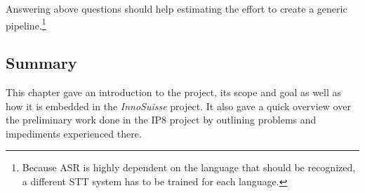 Answering above questions should help estimating the effort to create a generic pipeline.\footnote{Because \ac{ASR} is highly dependent on the language that should be recognized, a different \ac{STT} system has to be trained for each language.}

\subsection{Summary}
This chapter gave an introduction to the project, its scope and goal as well as how it is embedded in the \textit{InnoSuisse} project. It also gave a quick overview over the preliminary work done in the IP8 project by outlining problems and impediments experienced there.